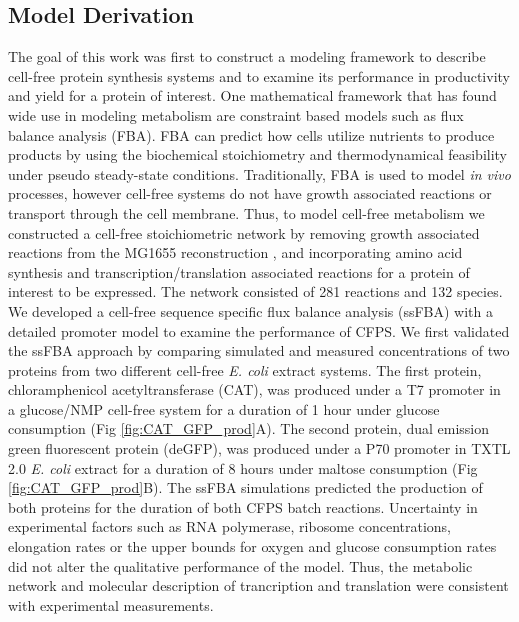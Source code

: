 \documentclass[journal=asbcd6,manuscript=article]{achemso}
\begin{document}
\subsection{Model Derivation}
The goal of this work was first to construct a modeling framework to describe cell-free protein synthesis systems and to examine its performance in productivity and yield for a protein of interest.
One mathematical framework that has found wide use in modeling metabolism are constraint based models such as flux balance analysis (FBA).
FBA can predict how cells utilize nutrients to produce products by using the biochemical stoichiometry and thermodynamical feasibility under pseudo steady-state conditions.
Traditionally, FBA is used to model \textit{in vivo} processes, however cell-free systems do not have growth associated reactions or transport through the cell membrane.
Thus, to model cell-free metabolism we constructed a cell-free stoichiometric network by removing growth associated reactions from the MG1655 reconstruction \cite{Feist:2007aa}, and incorporating amino acid synthesis and transcription/translation associated reactions \cite{Allen:2003aa} for a protein of interest to be expressed.
The network consisted of 281 reactions and 132 species.
We developed a cell-free sequence specific flux balance analysis (ssFBA) with a detailed promoter model \cite{Moon:2012aa} to examine the performance of CFPS.
We first validated the ssFBA approach by comparing simulated and measured concentrations of two proteins from two different cell-free \textit{E. coli} extract systems.
The first protein, chloramphenicol acetyltransferase (CAT), was produced under a T7 promoter in a glucose/NMP cell-free system \cite{2005_calhoun_BiotechnologyProgress} for a duration of 1 hour under glucose consumption (Fig \ref{fig:CAT_GFP_prod}A).
The second protein, dual emission green fluorescent protein (deGFP), was produced under a P70 promoter in TXTL 2.0 \textit{E. coli} extract for a duration of 8 hours under maltose consumption (Fig \ref{fig:CAT_GFP_prod}B).
The ssFBA simulations predicted the production of both proteins for the duration of both CFPS batch reactions.
Uncertainty in experimental factors such as RNA polymerase, ribosome concentrations, elongation rates or the upper bounds for oxygen and glucose consumption rates did not alter the qualitative performance of the model.
Thus, the metabolic network and molecular description of trancription and translation were consistent with experimental measurements.
\end{document}
